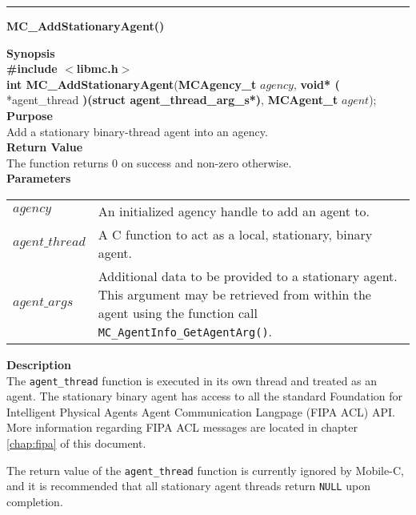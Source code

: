\noindent
\vspace{5pt}
\rule{6.5in}{0.015in}
\noindent
{}
{\LARGE \bf MC\_AddStationaryAgent()}\\
\label{api:MC_AddStationaryAgent()}

\noindent
{\bf Synopsis}\\
{\bf \#include $<$libmc.h$>$}\\
{\bf int MC\_AddStationaryAgent}({\bf MCAgency\_t} $agency$, {\bf void* (} *agent\_thread {\bf)(struct agent\_thread\_arg\_s*)}, {\bf MCAgent\_t} $agent$);\\
\noindent
{\bf Purpose}\\
Add a stationary binary-thread agent into an agency.\\

\noindent
{\bf Return Value}\\
The function returns 0 on success and non-zero otherwise.\\

\noindent
{\bf Parameters}
\vspace{-0.1in}
\begin{description}
\item
\begin{tabular}{p{20 mm}p{145 mm}} 
$agency$ & An initialized agency handle to add an agent to.\\
$agent\_thread$ & A C function to act as a local, stationary, binary agent.\\
$agent\_args$ & Additional data to be provided to a stationary agent. This
argument may be retrieved from within the agent using the function call
\texttt{MC\_AgentInfo\_GetAgentArg()}. \\
\end{tabular}
\end{description}

\noindent
{\bf Description}\\
The \texttt{agent\_thread} function is executed in its own thread and treated as an agent. The
stationary binary agent has access to all the standard Foundation for
Intelligent Physical Agents Agent Communication Langpage (FIPA ACL) API. More
information regarding FIPA ACL messages are located in chapter
\ref{chap:fipa} of this document.

The return value of the \texttt{agent\_thread} function is currently ignored by Mobile-C, and
it is recommended that all stationary agent threads return \texttt{NULL} upon completion.

